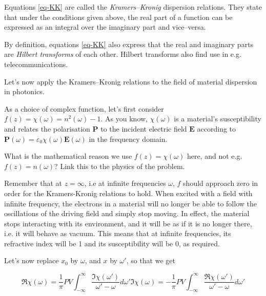 Equations \ref{eq-KK} are called the \emph{Kramers--Kronig} dispersion relations. They state that under the conditions given above, the real part of a function can be expressed as an integral over the imaginary part and vice--versa.

By definition, equations \ref{eq-KK} also express that the real and imaginary parts are \emph{Hilbert transforms} of each other. Hilbert transforms also find use in e.g. telecommunications.


\pagebreak


Let's now apply the Kramers--Kronig relations to the field of material dispersion in photonics.

As a choice of complex function, let's first consider $f(z) = \chi(\omega) =
n^2(\omega) -1$. As you know, $\chi(\omega)$ is a material's susceptibility and relates the polarisation $\mathbf{P}$ to the incident electric field $\mathbf{E}$ according to $\mathbf{P}(\omega)=\varepsilon_0 \chi(\omega) \mathbf{E}(\omega)$ in the frequency domain.

\begin{cue}
What is the mathematical reason we use $f(z) = \chi(\omega)$ here, and not e.g. $f(z) = n(\omega)$? Link this to the physics of the problem. 
\end{cue}

Remember that at $z=\infty$, i.e at infinite frequencies $\omega$, $f$ should approach zero in order for the Kramers-Kronig relations to hold. When excited with a field with infinite frequency, the electrons in a material will no longer be able to follow the oscillations of the driving field and simply stop moving. In effect, the material stops interacting with its environment, and it will be as if it is no longer there, i.e. it will behave as vacuum. This means that at infinite frequencies, its refractive index will be 1 and its susceptibility will be 0, as required.

Let's now replace $x_0$ by $\omega$, and $x$ by $\omega'$, so that we get

\begin{subequations} 
\begin{equation}
\Re \chi(\omega) = \frac{1}{\pi} PV \int_{- \infty}^{\infty} \frac{\Im
\chi(\omega')}{\omega'-\omega}d\omega'
\end{equation} 
\begin{equation}
\Im \chi(\omega) = -\frac{1}{\pi} PV \int_{- \infty}^{\infty} \frac{\Re
\chi(\omega')}{\omega'-\omega}d\omega'
\end{equation}
\label{eq-KK-2}
\end{subequations}

